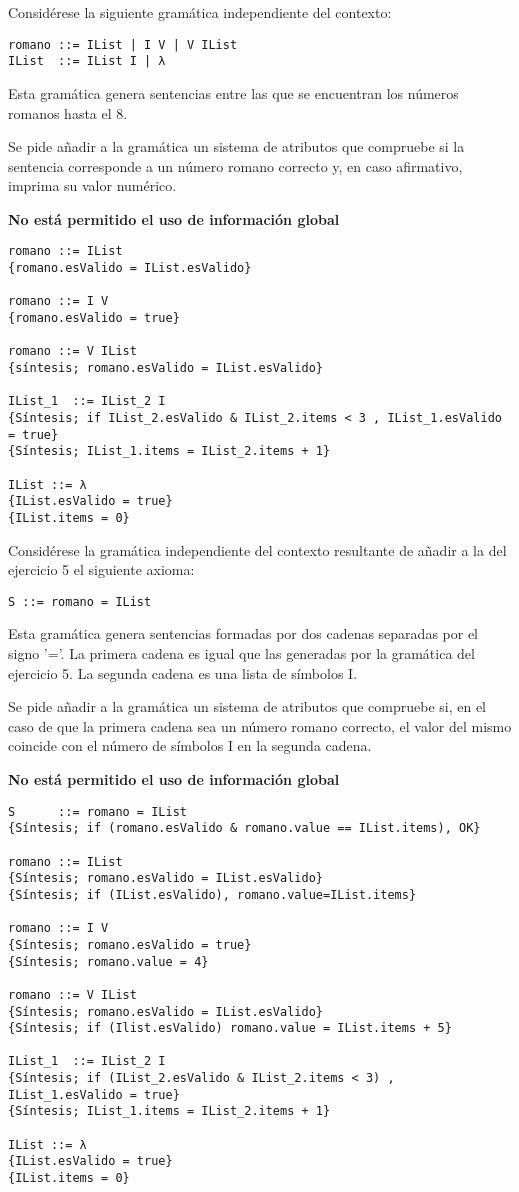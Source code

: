 \begin{problem}[5]
Considérese la siguiente gramática independiente del contexto:
\begin{verbatim}
romano ::= IList | I V | V IList
IList  ::= IList I | λ
\end{verbatim}
Esta gramática genera sentencias entre las que se encuentran los números romanos hasta el 8.

Se pide añadir a la gramática un sistema de atributos que compruebe si la sentencia corresponde a un número romano correcto y, en caso afirmativo, imprima su valor numérico.

\textbf{No está permitido el uso de información global}
\solution
\begin{verbatim}
romano ::= IList
{romano.esValido = IList.esValido}

romano ::= I V
{romano.esValido = true}

romano ::= V IList
{síntesis; romano.esValido = IList.esValido}

IList_1  ::= IList_2 I
{Síntesis; if IList_2.esValido & IList_2.items < 3 , IList_1.esValido = true}
{Síntesis; IList_1.items = IList_2.items + 1}

IList ::= λ
{IList.esValido = true}
{IList.items = 0}
\end{verbatim}
\end{problem}

\begin{problem}[6]
Considérese la gramática independiente del contexto resultante de añadir a la del ejercicio 5 el siguiente axioma:
\begin{verbatim}
S ::= romano = IList
\end{verbatim}
Esta gramática genera sentencias formadas por dos cadenas separadas por el signo '='. La primera cadena es igual que las generadas por la gramática del ejercicio 5. La segunda cadena es una lista de símbolos I.

Se pide añadir a la gramática un sistema de atributos que compruebe si, en el caso de que la primera cadena sea un número romano correcto, el valor del mismo coincide con el número de símbolos I en la segunda cadena.

\textbf{No está permitido el uso de información global}
\solution
\begin{verbatim}
S      ::= romano = IList
{Síntesis; if (romano.esValido & romano.value == IList.items), OK}

romano ::= IList
{Síntesis; romano.esValido = IList.esValido}
{Síntesis; if (IList.esValido), romano.value=IList.items}

romano ::= I V
{Síntesis; romano.esValido = true}
{Síntesis; romano.value = 4}

romano ::= V IList
{Síntesis; romano.esValido = IList.esValido}
{Síntesis; if (Ilist.esValido) romano.value = IList.items + 5}

IList_1  ::= IList_2 I
{Síntesis; if (IList_2.esValido & IList_2.items < 3) , IList_1.esValido = true}
{Síntesis; IList_1.items = IList_2.items + 1}

IList ::= λ
{IList.esValido = true}
{IList.items = 0}
\end{verbatim}
\end{problem}
